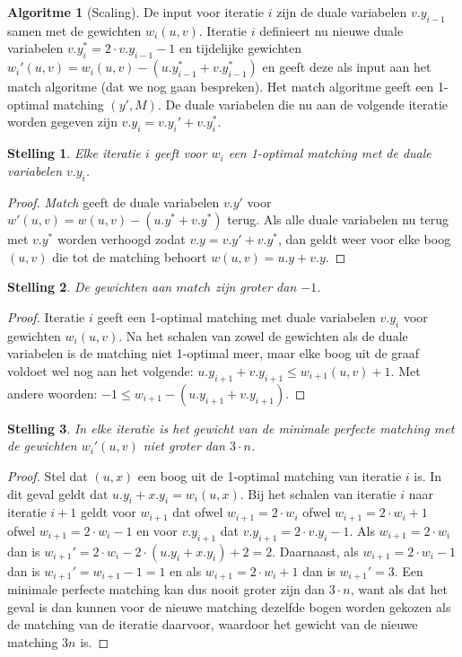 \documentclass[conference]{IEEEtran}
\newtheorem{theorem}{Stelling}[section]
\theoremstyle{definition}
\newtheorem{algorithmm}{Algoritme}[section]
\begin{document}
\begin{algorithmm}[Scaling]
    De input voor iteratie $i$ zijn de duale variabelen $v.y_{i-1}$ samen met de gewichten $w_i(u, v)$.
    Iteratie $i$ definieert nu nieuwe duale variabelen $v.y_{i}^{*} = 2 \cdot v.y_{i-1} - 1$ en tijdelijke gewichten $w_{i}'(u, v) = w_{i}(u, v) - (u.y_{i-1}^* + v.y_{i-1}^*)$ en geeft deze als input aan het match algoritme (dat we nog gaan bespreken). Het match algoritme geeft een 1-optimal matching $(y', M)$. De duale variabelen die nu aan de volgende iteratie worden gegeven zijn $v.y_i = v.y_i' + v.y_i^*$.
\end{algorithmm}

\begin{theorem}
    Elke iteratie $i$ geeft voor $w_i$ een 1-optimal matching met de duale variabelen $v.y_i$.
\end{theorem}
\begin{proof}
    \textit{Match} geeft de duale variabelen $v.y'$ voor $w'(u, v) = w(u, v) - (u.y^{*} + v.y^{*})$ terug. Als alle duale variabelen nu terug met $v.y^{*}$ worden verhoogd zodat $v.y = v.y' + v.y^{*}$, dan geldt weer voor elke boog $(u, v)$ die tot de matching behoort $w(u, v) = u.y + v.y$.
\end{proof}

\begin{theorem}
    De gewichten aan $match$ zijn groter dan $-1$.
\end{theorem}
\begin{proof}
    Iteratie $i$ geeft een 1-optimal matching met duale variabelen $v.y_i$ voor gewichten $w_i(u, v)$. Na het schalen van zowel de gewichten als de duale variabelen is de matching niet 1-optimal meer, maar elke boog uit de graaf voldoet wel nog aan het volgende: $u.y_{i + 1} + v.y_{i + 1} \leq w_{i + 1}(u, v) + 1$. Met andere woorden: $-1 \leq w_{i + 1} - (u.y_{i + 1} + v.y_{i + 1})$.
\end{proof}

\begin{theorem}
    In elke iteratie is het gewicht van de minimale perfecte matching met de gewichten $w_i'(u, v)$ niet groter dan $3 \cdot n$.
\end{theorem}
\begin{proof}
    Stel dat $(u, x)$ een boog uit de 1-optimal matching van iteratie $i$ is. In dit geval geldt dat $u.y_i + x.y_i = w_i(u, x)$. Bij het schalen van iteratie $i$ naar iteratie $i + 1$ geldt voor $w_{i + 1}$ dat ofwel $w_{i + 1} = 2 \cdot w_i$ ofwel $w_{i + 1} = 2 \cdot w_i + 1$ ofwel $w_{i + 1} = 2 \cdot w_i - 1$ en voor $v.y_{i + 1}$ dat $v.y_{i + 1} = 2 \cdot v.y_i - 1$.
    Als $w_{i + 1} = 2 \cdot w_i$ dan is $w_{i + 1}' = 2 \cdot w_i - 2 \cdot (u.y_i + x.y_i) + 2 = 2$. Daarnaast, als $w_{i + 1} = 2 \cdot w_i - 1$ dan is $w_{i + 1}' = w_{i + 1} - 1 = 1$ en als $w_{i + 1} = 2 \cdot w_i + 1$ dan is $w_{i + 1}' = 3$. Een minimale perfecte matching kan dus nooit groter zijn dan $3 \cdot n$, want als dat het geval is dan kunnen voor de nieuwe matching dezelfde bogen worden gekozen als de matching van de iteratie daarvoor, waardoor het gewicht van de nieuwe matching $3n$ is.
\end{proof}
\end{document}
